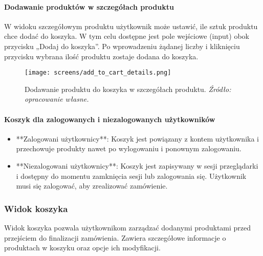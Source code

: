 \documentclass[12pt,a4paper,oneside]{article}
\theoremstyle{definition}
\numberwithin{equation}{section}
\begin{document}
   \paragraph{Dodawanie produktów w szczegółach produktu}
   W widoku szczegółowym produktu użytkownik może ustawić, ile sztuk produktu chce dodać do koszyka. W tym celu dostępne jest pole wejściowe (input) obok przycisku „Dodaj do koszyka”. Po wprowadzeniu żądanej liczby i kliknięciu przycisku wybrana ilość produktu zostaje dodana do koszyka.
   \begin{figure}[H]
    \centering
    \texttt{[image: screens/add\_to\_cart\_details.png]}
    \caption{Dodawanie produktu do koszyka w szczegółach produktu. \emph{Źródło: opracowanie własne.}}
    \label{fig:add_to_cart_details}
\end{figure}

   
   \paragraph{Koszyk dla zalogowanych i niezalogowanych użytkowników}
   \begin{itemize}
       \item **Zalogowani użytkownicy**: Koszyk jest powiązany z kontem użytkownika i przechowuje produkty nawet po wylogowaniu i ponownym zalogowaniu.
       \item **Niezalogowani użytkownicy**: Koszyk jest zapisywany w sesji przeglądarki i dostępny do momentu zamknięcia sesji lub zalogowania się. Użytkownik musi się zalogować, aby zrealizować zamówienie.
   \end{itemize}
   




   \subsubsection{Widok koszyka}
Widok koszyka pozwala użytkownikom zarządzać dodanymi produktami przed przejściem do finalizacji zamówienia. Zawiera szczegółowe informacje o produktach w koszyku oraz opcje ich modyfikacji.
\end{document}
